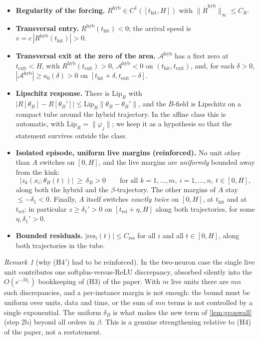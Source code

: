 \documentclass[11pt]{article}
\theoremstyle{definition}
\theoremstyle{remark}
\newtheorem{remark}{Remark}
\newcommand{\hyb}{\mathrm{hyb}}
\newcommand{\thit}{t_{\mathrm{hit}}}
\newcommand{\texit}{t_{\mathrm{exit}}}
\newcommand{\trel}{t_{\mathrm{rel}}}
\newcommand{\Ar}{\mathcal{A}}
\newcommand{\res}{\mathrm{res}}
\begin{document}
\begin{itemize}
\item[(H0$'$)] \textbf{Regularity of the forcing.}
$R^{\hyb}\in C^1([\thit,H])$ with $\|\dot R^{\hyb}\|_\infty\le C_R$.

\item[(H1$'$)] \textbf{Transversal entry.} $R^{\hyb}(\thit)<0$; the arrival speed
is $v=c\,|R^{\hyb}(\thit)|>0$.

\item[(H2$'$)] \textbf{Transversal exit at the zero of the area.}
$\Ar^{\hyb}$ has a first zero at $\texit<H$, with $R^{\hyb}(\texit)>0$,
$\Ar^{\hyb}<0$ on $(\thit,\texit)$, and, for each $\delta>0$,
$|\Ar^{\hyb}|\ge a_0(\delta)>0$ on $[\thit+\delta,\texit-\delta]$.

\item[(H3$'$)] \textbf{Lipschitz response.} There is $\mathrm{Lip}_R$ with
$|R[\theta_B]-R[\theta_B']|\le\mathrm{Lip}_R\|\theta_B-\theta_B'\|$, and the
$B$-field is Lipschitz on a compact tube around the hybrid trajectory. In the
affine class this is automatic, with
$\mathrm{Lip}_R=\|\varphi_j\|$; we keep it as a hypothesis so that the statement
survives outside the class.

\item[(H4$'$)] \textbf{Isolated episode, uniform live margins (reinforced).}
No unit other than $A$ switches on $[0,H]$, and the live margins are
\emph{uniformly} bounded away from the kink:
\[
\bigl|z_k(x_i;\theta_B(t))\bigr|\ \ge\ \delta_B>0
\qquad\text{for all }k=1,\dots,m,\ i=1,\dots,n,\ t\in[0,H],
\]
along both the hybrid and the $\beta$-trajectory. The other margins of $A$ stay
$\le-\delta_1<0$. Finally, $A$ itself switches \emph{exactly twice} on $[0,H]$,
at $\thit$ and at $\trel$; in particular $z\ge\delta_1'>0$ on $[\trel+\eta,H]$
along both trajectories, for some $\eta,\delta_1'>0$.

\item[(H5$'$)] \textbf{Bounded residuals.} $|\res_i(t)|\le C_{\mathrm{res}}$ for
all $i$ and all $t\in[0,H]$, along both trajectories in the tube.
\end{itemize}

\begin{remark}[why (H4$'$) had to be reinforced]\label{rem:H4}
In the two-neuron case the single live unit contributes one softplus-versus-ReLU
discrepancy, absorbed silently into the $O(e^{-\beta\delta_1})$ bookkeeping of
(H3) of the paper. With $m$ live units there are $mn$ such discrepancies, and a
per-instance margin is not enough: the bound must be uniform over units, data and
time, or the sum of $mn$ terms is not controlled by a single exponential. The
uniform $\delta_B$ is what makes the new term of \cref{lem:gronwall}(step 2b)
beyond all orders in $\beta$. This is a genuine strengthening relative to (H4) of
the paper, not a restatement.
\end{remark}
\end{document}
